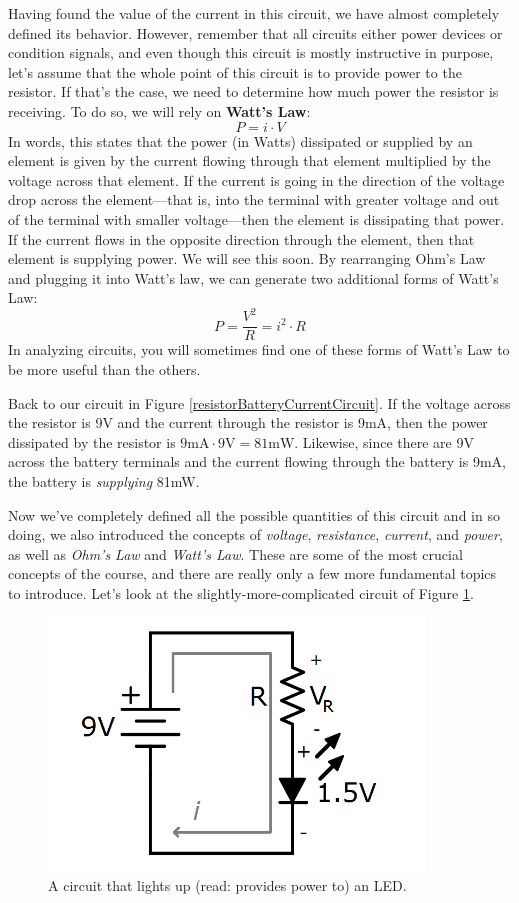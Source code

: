 \par
Having found the value of the current in this circuit, we have almost completely defined its behavior. However, remember that all circuits either power devices or condition signals, and even though this circuit is mostly instructive in purpose, let's assume that the whole point of this circuit is to provide power to the resistor. If that's the case, we need to determine how much power the resistor is receiving. To do so, we will rely on \textbf{Watt's Law}:
$$
P = i \cdot V
$$
In words, this states that the power (in Watts) dissipated or supplied by an element is given by the current flowing through that element multiplied by the voltage across that element. If the current is going in the direction of the voltage drop across the element---that is, into the terminal with greater voltage and out of the terminal with smaller voltage---then the element is dissipating that power. If the current flows in the opposite direction through the element, then that element is supplying power. We will see this soon.  By rearranging Ohm's Law and plugging it into Watt's law, we can generate two additional forms of Watt's Law:
$$
P = \frac{V^2}{R} = i^2\cdot R
$$
In analyzing circuits, you will sometimes find one of these forms of Watt's Law to be more useful than the others.
\par
Back to our circuit in Figure \ref{resistorBatteryCurrentCircuit}. If the voltage across the resistor is 9V and the current through the resistor is 9mA, then the power dissipated by the resistor is $9\textrm{mA}\cdot9\textrm{V} = 81\textrm{mW}$. Likewise, since there are 9V across the battery terminals and the current flowing through the battery is 9mA, the battery is \textit{supplying} 81mW.
\par
Now we've completely defined all the possible quantities of this circuit and in so doing, we also introduced the concepts of \textit{voltage}, \textit{resistance}, \textit{current}, and \textit{power}, as well as \textit{Ohm's Law} and \textit{Watt's Law}. These are some of the most crucial concepts of the course, and there are really only a few more fundamental topics to introduce. Let's look at the slightly-more-complicated circuit of Figure \ref{simpleLED}.
\begin{figure}[h!]
\centering
\includegraphics[width=10cm]{figures/LEDCircuit.png}
\caption{A circuit that lights up (read: provides power to) an LED.}
\label{simpleLED}
\end{figure}
